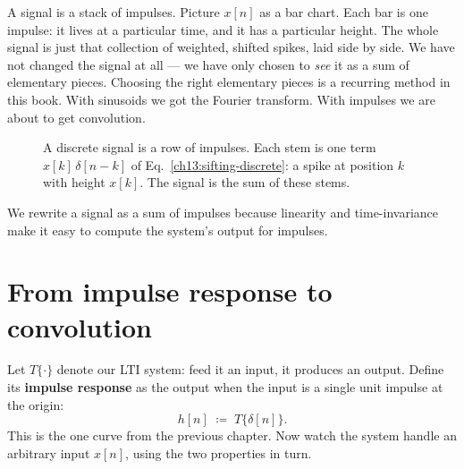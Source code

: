 \begin{intuitionbox}
A signal is a stack of impulses. Picture $x[n]$ as a bar chart. Each bar is one
impulse: it lives at a particular time, and it has a particular height. The
whole signal is just that collection of weighted, shifted spikes,
laid side by side. We have not changed the signal at all --- we have only
chosen to \emph{see} it as a sum of elementary pieces. Choosing the right
elementary pieces is a recurring method in this book. With sinusoids we
got the Fourier transform. With impulses we are about to get convolution.
\end{intuitionbox}

\begin{figure}[H]
\centering
{}
\caption{A discrete signal is a row of impulses. Each stem is one term
$x[k]\,\delta[n-k]$ of Eq.~\eqref{ch13:sifting-discrete}: a spike at position
$k$ with height $x[k]$. The signal is the sum of these stems.}
\label{ch13:fig-stems}
\end{figure}

We rewrite a signal as a sum of impulses because linearity and time-invariance
make it easy to compute the system's output for impulses.

\section{From impulse response to convolution}
\label{ch13:derive}

Let $T\{\cdot\}$ denote our LTI system: feed it an input, it produces an
output. Define its \textbf{impulse response} as the output when the input is a
single unit impulse at the origin:
\begin{equation}
\label{ch13:imp-resp-def}
h[n] \;\coloneqq\; T\{\delta[n]\}.
\end{equation}
This is the one curve from the previous chapter. Now watch the system handle an
arbitrary input $x[n]$, using the two properties in turn.

